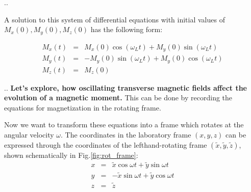 \documentclass{beamer}
\begin{document}
\begin{frame}[shrink=5]{\thesection.\thesubsection. \insertsubsection}
		    
		    A solution to this system of differential equations with initial values of $M_x(0), M_y(0), M_z(0)$ has the following form:
		    
		    \begin{equation} 
		    \begin{array}{lcl}
		    M_x(t) &=& M_x(0) \cos(\omega_L t) + M_y(0) \sin (\omega_L t) \\
		    M_y(t) &=& -M_y(0) \sin(\omega_L t) + M_y(0) \cos (\omega_L t) \\
		    M_z(t) &=& M_z(0) 
		    \end{array}
		    \end{equation}		

		    	    
\end{frame}
\begin{frame}[shrink=5]{\thesection.\thesubsection. \insertsubsection}
  \textbf{ Let's explore, how oscillating transverse magnetic fields affect the evolution of a magnetic moment.}
  This can be done by recording the equations for magnetization in the \alert{rotating frame}.
	
  
  Now we  want to transform these equations into a frame which rotates at the angular velocity $\omega$.  The coordinates in the laboratory frame $(x,y,z)$ can be expressed through the coordinates of the lefthand-rotating frame $(\tilde{x}, \tilde{y}, \tilde{z})$, shown schematically in Fig.\ref{fig:rot_frame}:
 \begin{equation}
 \begin{array}{lcl}
 x &=& \tilde{x} \cos \omega t + \tilde{y} \sin \omega t \\
 y &=& -\tilde{x} \sin \omega t + \tilde{y} \cos \omega t \\
 z &=& \tilde{z}
 \end{array}
 \end{equation}
 

\end{frame}
\end{document}
